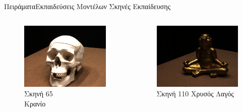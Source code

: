 \documentclass[10pt]{beamer}
\begin{document}
\begin{frame}{Πειράματα}{Εκπαιδεύσεις Μοντέλων}
Σκηνές Εκπαίδευσης
    \begin{columns}
        \begin{figure}
            \centering
            \includegraphics[height=.2\textheight]{images/Skull_GT.png}
            \caption{Σκηνή 65 \\ Κρανίο}
        \end{figure}
        \begin{figure}
            \centering
            \includegraphics[height=.2\textheight]{images/Rabbit_GT.png}
            \caption{Σκηνή 110  Χρυσός Λαγός}
        \end{figure}

\end{columns}
\end{frame}
\end{document}
